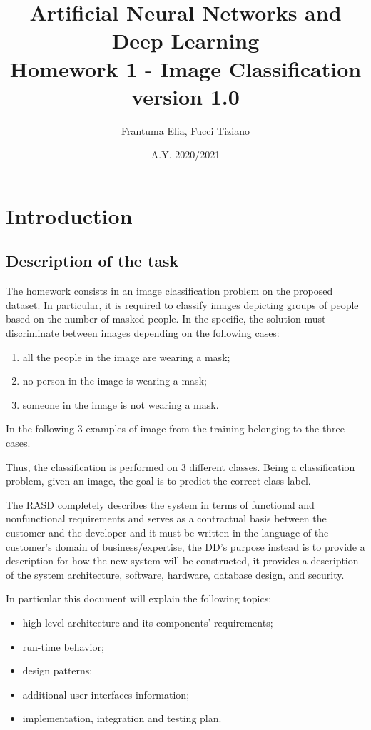\documentclass[12pt,a4paper]{report}
\title{Artificial Neural Networks and Deep Learning \\ Homework 1 - Image Classification \\ \large version 1.0}
\author{Frantuma Elia, Fucci Tiziano}
\date{A.Y. 2020/2021}
\begin{document}
	\maketitle
	\tableofcontents
	\chapter{Introduction}
		\section{Description of the task}
			The homework consists in an image classification problem on the proposed dataset. In particular, it is required to classify images depicting groups of people based on the number of masked people. In the specific, the solution must discriminate between images depending on the following cases:

\begin{enumerate} 
	\item all the people in the image are wearing a mask;
	\item no person in the image is wearing a mask;
	\item someone in the image is not wearing a mask.
\end{enumerate}
In the following 3 examples of image from the training belonging to the three cases.

Thus, the classification is performed on 3 different classes. Being a classification problem, given an image, the goal is to predict the correct class label.


			The RASD completely describes the system in terms of functional and nonfunctional requirements and
			serves as a contractual basis between the customer and the developer and it must be written in the language of
			the customer's domain of business/expertise, the DD's purpose instead is to provide a description for how the new
			system will be constructed, it provides a description of the system architecture, software, hardware, database
			design, and security.


			In particular this document will explain the following topics:
			\begin{itemize}
				\item high level architecture and its components' requirements;
				\item run-time behavior;
				\item design patterns;
				\item additional user interfaces information;
				\item implementation, integration and testing plan.
			\end{itemize}
\end{document}
